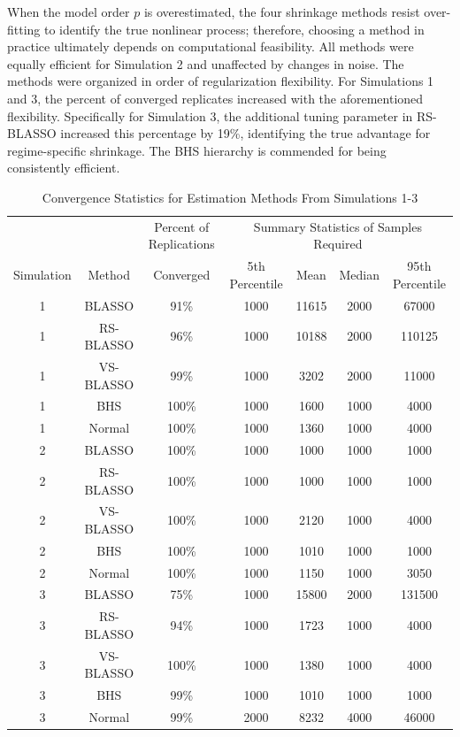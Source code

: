 When the model order $p$ is overestimated, the four shrinkage methods resist over-fitting to identify the true nonlinear process; therefore, choosing a method in practice ultimately depends on computational feasibility. All methods were equally efficient for Simulation 2 and unaffected by changes in noise. The methods were organized in order of regularization flexibility. For Simulations 1 and 3, the percent of converged replicates increased with the aforementioned flexibility. Specifically for Simulation 3, the additional tuning parameter in RS-BLASSO increased this percentage by 19\%, identifying the true advantage for regime-specific shrinkage. The BHS hierarchy is commended for being consistently efficient.

\begin{table}[!h]
\scriptsize
  \centering
  \caption{Convergence Statistics for Estimation Methods From Simulations 1-3}
    \begin{tabular}{cc|c|cccc}
    \toprule
    & & Percent of Replications & \multicolumn{4}{c}{Summary Statistics of Samples Required}\\
    Simulation & Method & Converged  & 5th Percentile   & Mean & Median & 95th Percentile \\
    \midrule
    1    & BLASSO & 91\%   & 1000 & 11615 & 2000 & 67000 \\
    1    & RS-BLASSO & 96\%    & 1000 & 10188 & 2000 & 110125 \\
    1    & VS-BLASSO & 99\%    & 1000 & 3202 & 2000 & 11000 \\
    1    & BHS  & 100\%   & 1000 & 1600 & 1000 & 4000 \\
    1    & Normal & 100\%   & 1000 & 1360 & 1000 & 4000 \\
    \midrule
    2    & BLASSO & 100\%   & 1000 & 1000 & 1000 & 1000 \\
    2    & RS-BLASSO & 100\%   & 1000 & 1000 & 1000 & 1000 \\
    2    & VS-BLASSO & 100\%   & 1000 & 2120 & 1000 & 4000 \\
    2    & BHS  & 100\%   & 1000 & 1010 & 1000 & 1000 \\
    2    & Normal & 100\%   & 1000 & 1150 & 1000 & 3050 \\
    \midrule
    3    & BLASSO & 75\%    & 1000 & 15800 & 2000 & 131500 \\
    3    & RS-BLASSO & 94\%    & 1000 & 1723 & 1000 & 4000 \\
    3    & VS-BLASSO & 100\%   & 1000 & 1380 & 1000 & 4000 \\
    3    & BHS  & 99\%    & 1000 & 1010 & 1000 & 1000 \\
    3    & Normal & 99\%    & 2000 & 8232 & 4000 & 46000 \\
    \bottomrule
    \end{tabular}%
  \label{tab:convtable}%
\end{table}%

